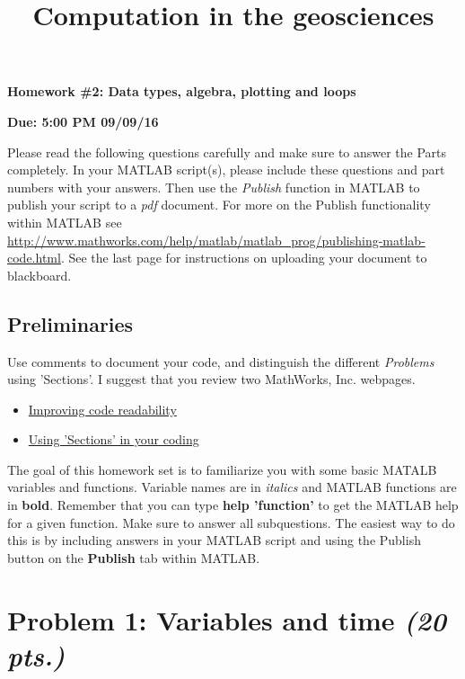 \documentclass[10pt]{article}
\title{Computation in the geosciences}
\date{\empty}
\begin{document}
\begin{multicols}{2}
\begin{flushleft}
\textbf{Homework \#2: Data types, algebra, plotting and loops}
\end{flushleft}
\columnbreak 
\begin{flushright}
\textbf{Due: 5:00 PM 09/09/16}
\end{flushright}
\end{multicols}

Please read the following questions carefully and make sure to answer the Parts completely. In your MATLAB script(s), please include these questions and part numbers with your answers. Then use the \textit{Publish} function in MATLAB to publish your script to a \textit{pdf} document. For more on the Publish functionality within MATLAB see \url{http://www.mathworks.com/help/matlab/matlab_prog/publishing-matlab-code.html}. See the last page for instructions on uploading your document to blackboard.

\subsection*{Preliminaries}

Use comments to document your code, and distinguish the different \textit{Problems} using 'Sections'. I suggest that you review two MathWorks, Inc. webpages.
\begin{itemize}
	\item \href{http://www.mathworks.com/help/matlab/matlab_prog/improve-code-readability.html}{Improving code readability}
	\item \href{http://www.mathworks.com/help/matlab/matlab_prog/run-sections-of-programs.html}{Using 'Sections' in your coding}
\end{itemize}

The goal of this homework set is to familiarize you with some basic MATALB variables and functions. Variable names are in \textit{italics} and MATLAB functions are in \textbf{bold}. Remember that you can type \textbf{help 'function'} to get the MATLAB help for a given function. Make sure to answer all subquestions. The easiest way to do this is by including answers in your MATLAB script and using the Publish button on the \textbf{Publish} tab within MATLAB.

\section*{Problem 1: Variables and time \textit{(20 pts.)}}
\end{document}
